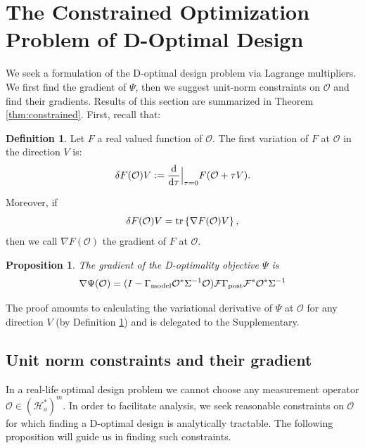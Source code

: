 \documentclass[ba]{imsart}
\newcommand{\der}{\text{\textup{d}}}
\newcommand{\hilo}{\mathcal{H}_o}
\newcommand{\obs}{\mathcal{O}}
\newcommand{\fwd}{\mathcal{F}}
\newcommand{\tar}{\Psi}
\newcommand{\tr}[1]{\textup{tr}\left \{#1 \right \} }
\theoremstyle{plain}
\newtheorem{proposition}[theorem]{Proposition}
\theoremstyle{definition}
\newtheorem{definition}[theorem]{Definition}
\theoremstyle{remark}
\begin{document}
 \section{The Constrained Optimization Problem of D-Optimal Design}\label{section:D_and_grad}
We seek a formulation of the D-optimal design problem via Lagrange
multipliers. We first find the gradient of $\tar$, then we suggest
unit-norm constraints on $\obs$ and find their gradients. Results of
this section are summarized in Theorem \ref{thm:constrained}. First,
recall that:
\begin{definition}\label{def:var}
  Let $F$ a real valued function of $\obs$. The first variation of $F$
  at $\obs$ in the direction $V$ is:
  \begin{equation*}
    \delta F(\obs) V := \frac{\der}{\der \tau}\Big |_{\tau=0}  F( \obs + \tau V).
  \end{equation*}

  Moreover, if
  \begin{equation*}
    \delta F(\obs) V = \tr{\nabla F(\obs) V},
  \end{equation*}
  then we call $\nabla F(\obs)$ the gradient of $F$ at $\obs$. 
\end{definition}






\begin{proposition}\label{prop:tar_grad}
  The gradient of the D-optimality objective $\tar$ is
  \begin{equation*}
\nabla \tar(\obs) = ( I - \modcov \obs^* \Sigma^{-1}\obs ) \fwd
    \postcov \fwd^* \obs^* \Sigma^{-1}
  \end{equation*}
\end{proposition}

The proof amounts to calculating the variational derivative of $\tar$
at $\obs$ for any direction $V$ (by Definition \ref{def:var}) and is
delegated to the Supplementary.


\subsection{Unit norm constraints and their gradient}
In a real-life optimal design problem we cannot choose any measurement
operator $\obs \in (\hilo^*)^m$. In order to facilitate analysis, we
seek reasonable constraints on $\obs$ for which finding a D-optimal
design is analytically tractable. The following proposition will guide
us in finding such constraints.
\end{document}
